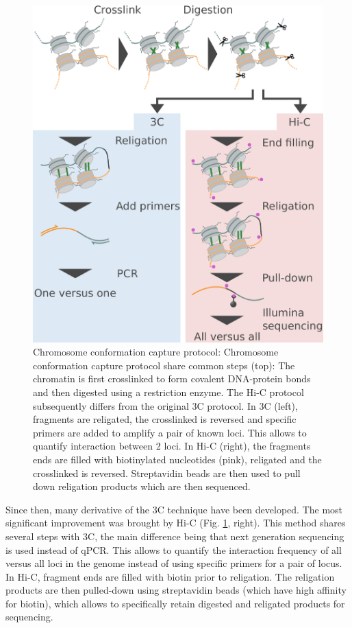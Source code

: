 \begin{figure}[b]
    \includegraphics[width=\textwidth]{"Parts/Part01/gfx/3c_protocol.pdf"}
    \caption{Chromosome conformation capture protocol: Chromosome conformation capture protocol share common steps (top): The chromatin is first crosslinked to form covalent DNA-protein bonds and then digested using a restriction enzyme. The Hi-C protocol subsequently differs from the original 3C protocol. In 3C (left), fragments are religated, the crosslinked is reversed and specific primers are added to amplify a pair of known loci. This allows to quantify interaction between 2 loci. In Hi-C (right), the fragments ends are filled with biotinylated nucleotides (pink), religated and the crosslinked is reversed. Streptavidin beads are then used to pull down religation products which are then sequenced.}
	\label{fig:01-02:3c}
\end{figure}

Since then, many derivative of the \acrshort{3C} technique have been developed. The most significant improvement was brought by Hi-C (Fig. \ref{fig:01-02:3c}, right). This method shares several steps with 3C, the main difference being that next generation sequencing is used instead of qPCR. This allows to quantify the interaction frequency of all versus all loci in the genome instead of using specific primers for a pair of locus. In Hi-C, fragment ends are filled with biotin prior to religation. The religation products are then pulled-down using streptavidin beads (which have high affinity for biotin), which allows to specifically retain digested  and religated products for sequencing.

